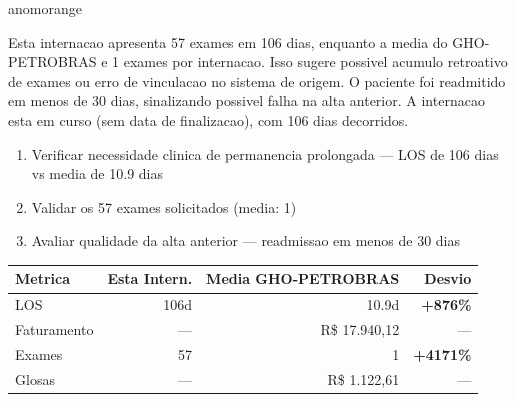 \documentclass[a4paper,10pt]{article}
\begin{document}
\begin{anomalycard}[Internacao 157909 | GHO-PETROBRAS | ALTO (z=4.42)]{anomorange}
\vspace{2pt}\begin{tcolorbox}[colback=severityred!20,colframe=anomorange,title={\textbf{Interpretacao de Negocio}},fonttitle=\bfseries\small,left=4pt,right=4pt,top=3pt,bottom=3pt]
{\small Esta internacao apresenta 57 exames em 106 dias, enquanto a media do GHO-PETROBRAS e 1 exames por internacao. Isso sugere possivel acumulo retroativo de exames ou erro de vinculacao no sistema de origem. O paciente foi readmitido em menos de 30 dias, sinalizando possivel falha na alta anterior. A internacao esta em curso (sem data de finalizacao), com 106 dias decorridos.}
\end{tcolorbox}
\begin{tcolorbox}[colback=severityyellow!30,colframe=anomorange,title={\textbf{Recomendacoes Especificas}},fonttitle=\bfseries\small,left=4pt,right=4pt,top=3pt,bottom=3pt]
\begin{enumerate}[nosep,leftmargin=16pt]
\item {\small Verificar necessidade clinica de permanencia prolongada --- LOS de 106 dias vs media de 10.9 dias}
\item {\small Validar os 57 exames solicitados (media: 1)}
\item {\small Avaliar qualidade da alta anterior --- readmissao em menos de 30 dias}
\end{enumerate}
\end{tcolorbox}
\begin{center}\begin{tabular}{l r r r}\toprule\textbf{Metrica} & \textbf{Esta Intern.} & \textbf{Media GHO-PETROBRAS} & \textbf{Desvio} \\\midrule
LOS & 106d & 10.9d & \textcolor{anomred}{\textbf{+876\%}} \\
Faturamento & --- & R\$ 17.940,12 & --- \\
Exames & 57 & 1 & \textcolor{anomred}{\textbf{+4171\%}} \\
Glosas & --- & R\$ 1.122,61 & --- \\
\bottomrule\end{tabular}\end{center}


\end{anomalycard}
\end{document}
